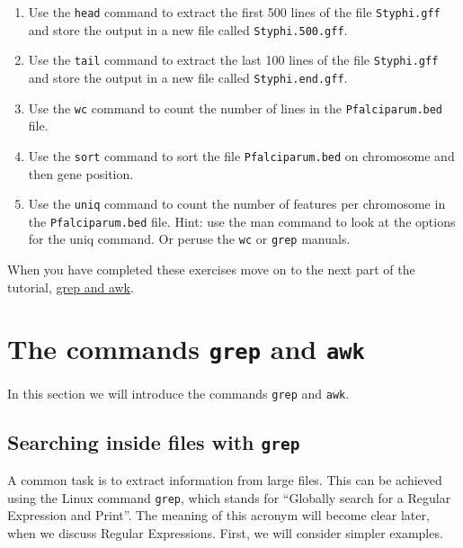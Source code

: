 \documentclass[11pt]{article}
\providecommand{\tightlist}{%
      \setlength{\itemsep}{0pt}\setlength{\parskip}{0pt}}
\begin{document}
\begin{enumerate}
\def\labelenumi{\arabic{enumi}.}
\tightlist
\item
  Use the \texttt{head} command to extract the first 500 lines of the
  file \texttt{Styphi.gff} and store the output in a new file called
  \texttt{Styphi.500.gff}.
\item
  Use the \texttt{tail} command to extract the last 100 lines of the
  file \texttt{Styphi.gff} and store the output in a new file called
  \texttt{Styphi.end.gff}.
\item
  Use the \texttt{wc} command to count the number of lines in the
  \texttt{Pfalciparum.bed} file.
\item
  Use the \texttt{sort} command to sort the file
  \texttt{Pfalciparum.bed} on chromosome and then gene position.
\item
  Use the \texttt{uniq} command to count the number of features per
  chromosome in the \texttt{Pfalciparum.bed} file. Hint: use the man
  command to look at the options for the uniq command. Or peruse the
  \texttt{wc} or \texttt{grep} manuals.
\end{enumerate}

    When you have completed these exercises move on to the next part of the
tutorial, \href{grep_and_awk.ipynb}{grep and awk}.





\newpage





    \hypertarget{the-commands-grep-and-awk}{%
\section{\texorpdfstring{The commands \texttt{grep} and
\texttt{awk}}{The commands grep and awk}}\label{the-commands-grep-and-awk}}

In this section we will introduce the commands \texttt{grep} and
\texttt{awk}.

    \hypertarget{searching-inside-files-with-grep}{%
\subsection{\texorpdfstring{Searching inside files with
\texttt{grep}}{Searching inside files with grep}}\label{searching-inside-files-with-grep}}

A common task is to extract information from large files. This can be
achieved using the Linux command \texttt{grep}, which stands for
``Globally search for a Regular Expression and Print''. The meaning of
this acronym will become clear later, when we discuss Regular
Expressions. First, we will consider simpler examples.
\end{document}
